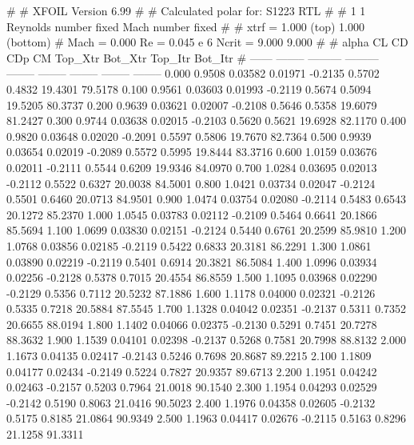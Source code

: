#  
#       XFOIL         Version 6.99
#  
# Calculated polar for: S1223 RTL                                       
#  
# 1 1 Reynolds number fixed          Mach number fixed         
#  
# xtrf =   1.000 (top)        1.000 (bottom)  
# Mach =   0.000     Re =     0.045 e 6     Ncrit =   9.000  9.000
#  
#   alpha    CL        CD       CDp       CM     Top_Xtr  Bot_Xtr  Top_Itr  Bot_Itr
#  ------ -------- --------- --------- -------- -------- -------- -------- --------
   0.000   0.9508   0.03582   0.01971  -0.2135   0.5702   0.4832  19.4301  79.5178
   0.100   0.9561   0.03603   0.01993  -0.2119   0.5674   0.5094  19.5205  80.3737
   0.200   0.9639   0.03621   0.02007  -0.2108   0.5646   0.5358  19.6079  81.2427
   0.300   0.9744   0.03638   0.02015  -0.2103   0.5620   0.5621  19.6928  82.1170
   0.400   0.9820   0.03648   0.02020  -0.2091   0.5597   0.5806  19.7670  82.7364
   0.500   0.9939   0.03654   0.02019  -0.2089   0.5572   0.5995  19.8444  83.3716
   0.600   1.0159   0.03676   0.02011  -0.2111   0.5544   0.6209  19.9346  84.0970
   0.700   1.0284   0.03695   0.02013  -0.2112   0.5522   0.6327  20.0038  84.5001
   0.800   1.0421   0.03734   0.02047  -0.2124   0.5501   0.6460  20.0713  84.9501
   0.900   1.0474   0.03754   0.02080  -0.2114   0.5483   0.6543  20.1272  85.2370
   1.000   1.0545   0.03783   0.02112  -0.2109   0.5464   0.6641  20.1866  85.5694
   1.100   1.0699   0.03830   0.02151  -0.2124   0.5440   0.6761  20.2599  85.9810
   1.200   1.0768   0.03856   0.02185  -0.2119   0.5422   0.6833  20.3181  86.2291
   1.300   1.0861   0.03890   0.02219  -0.2119   0.5401   0.6914  20.3821  86.5084
   1.400   1.0996   0.03934   0.02256  -0.2128   0.5378   0.7015  20.4554  86.8559
   1.500   1.1095   0.03968   0.02290  -0.2129   0.5356   0.7112  20.5232  87.1886
   1.600   1.1178   0.04000   0.02321  -0.2126   0.5335   0.7218  20.5884  87.5545
   1.700   1.1328   0.04042   0.02351  -0.2137   0.5311   0.7352  20.6655  88.0194
   1.800   1.1402   0.04066   0.02375  -0.2130   0.5291   0.7451  20.7278  88.3632
   1.900   1.1539   0.04101   0.02398  -0.2137   0.5268   0.7581  20.7998  88.8132
   2.000   1.1673   0.04135   0.02417  -0.2143   0.5246   0.7698  20.8687  89.2215
   2.100   1.1809   0.04177   0.02434  -0.2149   0.5224   0.7827  20.9357  89.6713
   2.200   1.1951   0.04242   0.02463  -0.2157   0.5203   0.7964  21.0018  90.1540
   2.300   1.1954   0.04293   0.02529  -0.2142   0.5190   0.8063  21.0416  90.5023
   2.400   1.1976   0.04358   0.02605  -0.2132   0.5175   0.8185  21.0864  90.9349
   2.500   1.1963   0.04417   0.02676  -0.2115   0.5163   0.8296  21.1258  91.3311
